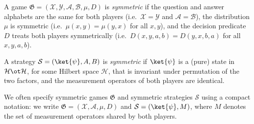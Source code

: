 \begin{definition}\label{def:symmetric-game}
	\leanok
	A game $\mathfrak G = (\mathcal X, \mathcal Y, \mathcal A, \mathcal B, \mu, D)$ is \emph{symmetric} if the question and answer alphabets are the same for both players (i.e.\ $\mathcal X = \mathcal Y$ and $\mathcal A = \mathcal B$), the distribution $\mu$ is symmetric (i.e.\ $\mu(x,y) = \mu(y,x)$ for all $x,y$), and the decision predicate $D$ treats both players symmetrically (i.e.\ $D(x,y,a,b) = D(y,x,b,a)$ for all $x,y,a,b$).

	A strategy $\mathcal S = (\ket{\psi}, A, B)$ is \emph{symmetric} if $\ket{\psi}$ is a (pure) state in $\mathcal H \ot \mathcal H$, for some Hilbert space $\mathcal H$, that is invariant under permutation of the two factors, and the measurement operators of both players are identical.
\end{definition}

We often specify symmetric games $\mathfrak G$ and symmetric strategies $\mathcal S$ using a compact notation: we write $\mathfrak G = (\mathcal X, \mathcal A, \mu, D)$ and $\mathcal S = (\ket{\psi}, M)$, where $M$ denotes the set of measurement operators shared by both players.

